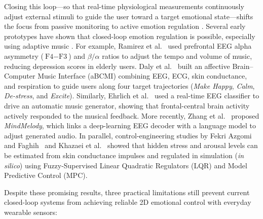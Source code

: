 \documentclass[preprint,12pt]{elsarticle}
\begin{document}
Closing this loop---so that real-time physiological measurements continuously adjust external stimuli to guide the user toward a target emotional state---shifts the focus from passive monitoring to active emotion regulation \cite{ewing2016evaluation,lorenz2016automatic}. Several early prototypes have shown that closed-loop emotion regulation is possible, especially using adaptive music \cite{sayal2025music,ramirez2015musical,daly2016affective,ehrlich2019closed}. For example, Ramirez et al.~\cite{ramirez2015musical} used prefrontal EEG alpha asymmetry ($\text{F4}-\text{F3}$) and $\beta/\alpha$ ratios to adjust the tempo and volume of music, reducing depression scores in elderly users. Daly et al.~\cite{daly2016affective} built an affective Brain--Computer Music Interface (aBCMI) combining EEG, ECG, skin conductance, and respiration to guide users along four target trajectories (\emph{Make Happy}, \emph{Calm}, \emph{De-stress}, and \emph{Excite}). Similarly, Ehrlich et al.~\cite{ehrlich2019closed} used a real-time EEG classifier to drive an automatic music generator, showing that frontal-central brain activity actively responded to the musical feedback. More recently, Zhang et al.~\cite{zhang2026mindmelody} proposed \emph{MindMelody}, which links a deep-learning EEG decoder with a language model to adjust generated audio. In parallel, control-engineering studies by Fekri Azgomi and Faghih~\cite{azgomi2022enhancement} and Khazaei et al.~\cite{khazaei2024bayesian} showed that hidden stress and arousal levels can be estimated from skin conductance impulses and regulated in simulation (\emph{in silico}) using Fuzzy-Supervised Linear Quadratic Regulators (LQR) and Model Predictive Control (MPC).

Despite these promising results, three practical limitations still prevent current closed-loop systems from achieving reliable 2D emotional control with everyday wearable sensors:
\end{document}

